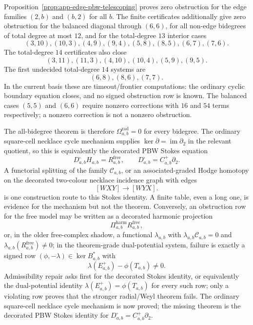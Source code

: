 \begin{enumerate}
  Proposition~\ref{prop:app-edge-pbw-telescoping} proves zero obstruction
  for the edge families \((2,b)\) and \((b,2)\) for all \(b\).  The
  finite certificates additionally give zero obstruction for the balanced
  diagonal through \((6,6)\), for all non-edge bidegrees of total degree
  at most \(12\), and for the total-degree \(13\) interior cases
  \[
    (3,10),(10,3),(4,9),(9,4),(5,8),(8,5),(6,7),(7,6).
  \]
  The total-degree \(14\) certificates also close
  \[
    (3,11),(11,3),(4,10),(10,4),(5,9),(9,5).
  \]
  The first undecided total-degree \(14\) systems are
  \[
    (6,8),(8,6),(7,7).
  \]
  In the current basis these are timeout/frontier computations: the
  ordinary cyclic boundary equation closes, and no signed obstruction row
  is known.  The balanced cases \((5,5)\) and \((6,6)\) require nonzero
  corrections with \(16\) and \(54\) terms respectively; a nonzero
  correction is not a nonzero obstruction.

  The all-bidegree theorem is therefore
  \(\Omega^{\mathrm{rad}}_{a,b}=0\) for every bidegree.  The ordinary
  square-cell necklace cycle mechanism supplies
  \(\ker\partial=\operatorname{im}\partial_2\) in the relevant quotient,
  so this is equivalently the decorated PBW Stokes equation
  \[
    D^\square_{a,b}H_{a,b}=R^{\mathrm{free}}_{a,b},
    \qquad
    D^\square_{a,b}=C^+_{a,b}\partial_2 .
  \]
  A functorial splitting of the family \(\mathcal C_{a,b}\), or an
  associated-graded Hodge homotopy on the decorated two-colour necklace
  incidence graph with edges
  \[
    [WXY]\longrightarrow[WYX].
  \]
  is one construction route to this Stokes identity.  A finite table,
  even a long one, is evidence for the mechanism but not the theorem.
  Conversely, an obstruction row for the free model may be written as a
  decorated harmonic projection
  \[
    \Pi^{\mathrm{harm}}_{a,b}R^{\mathrm{free}}_{a,b},
  \]
  or, in the older free-complex shadow, a functional
  \(\lambda_{a,b}\) with
  \(\lambda_{a,b}\mathcal C_{a,b}=0\) and
  \(\lambda_{a,b}(R^{\mathrm{free}}_{a,b})\ne0\); in the theorem-grade
  dual-potential system, failure is exactly a signed row
  \((\phi,-\lambda)\in\ker B_{a,b}^*\) with
  \[
    \lambda(E^+_{a,b})-\phi(T_{a,b})\ne0.
  \]
  Admissibility repair asks first for the decorated Stokes identity, or
  equivalently the dual-potential identity
  \(\lambda(E^+_{a,b})=\phi(T_{a,b})\) for every such row; only a
  violating row proves that the stronger radial/Weyl theorem fails.  The
  ordinary square-cell necklace cycle mechanism is now proved; the
  missing theorem is the decorated PBW Stokes identity for
  \(D^\square_{a,b}=C^+_{a,b}\partial_2\).


\end{enumerate}
